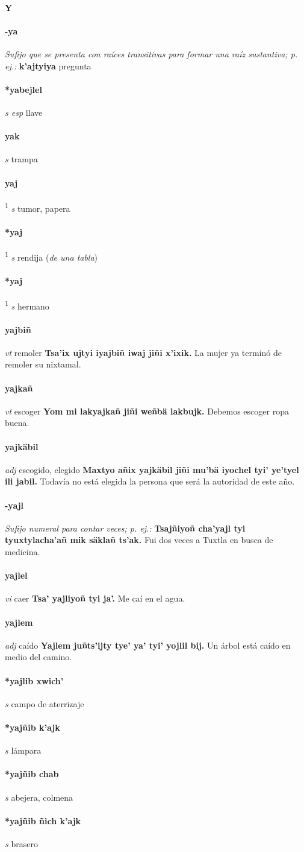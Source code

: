 \documentclass{scrbook}
\newcommand{\entry}[1]{\paragraph{#1}}
\newcommand{\alphaletter}[1]{\addsec{#1}}
\newcommand{\defsuperscript}[1]{\textsuperscript{1}}
\newcommand{\nontranslationdef}[1]{\textit{#1}}
\newcommand{\partofspeech}[1]{\textit{#1}}
\newcommand{\spanishtranslation}[1]{#1}
\newcommand{\clarification}[1]{(\textit{#1})}
\newcommand{\cholexample}[1]{\textbf{#1}}
\newcommand{\exampletranslation}[1]{#1}
\begin{document}
\begin{multicols}{2}
\entry{Y}
\alphaletter{Y}

\entry{-ya}
\nontranslationdef{Sufijo que se presenta con raíces transitivas para formar una raíz sustantiva; p. ej.:}
\cholexample{k'ajtyiya}
\exampletranslation{pregunta}

\entry{*yabejlel}
\partofspeech{s esp}
\spanishtranslation{llave}

\entry{yak}
\partofspeech{s}
\spanishtranslation{trampa}

\entry{yaj}
\defsuperscript{1}
\partofspeech{s}
\spanishtranslation{tumor, papera}

\entry{*yaj}
\defsuperscript{2}
\partofspeech{s}
\spanishtranslation{rendija}
\clarification{de una tabla}

\entry{*yaj}
\defsuperscript{3}
\partofspeech{s}
\spanishtranslation{hermano}

\entry{yajbiñ}
\partofspeech{vt}
\spanishtranslation{remoler}
\cholexample{Tsa'ix ujtyi iyajbiñ iwaj jiñi x'ixik.}
\exampletranslation{La mujer ya terminó de remoler su nixtamal.}

\entry{yajkañ}
\partofspeech{vt}
\spanishtranslation{escoger}
\cholexample{Yom mi lakyajkañ jiñi weñbä lakbujk.}
\exampletranslation{Debemos escoger ropa buena.}

\entry{yajkäbil}
\partofspeech{adj}
\spanishtranslation{escogido, elegido}
\cholexample{Maxtyo añix yajkäbil jiñi mu'bä iyochel tyi' ye'tyel ili jabil.}
\exampletranslation{Todavía no está elegida la persona que será la autoridad de este año.}

\entry{-yajl}
\nontranslationdef{Sufijo numeral para contar veces; p. ej.:}
\cholexample{Tsajñiyoñ cha'yajl tyi tyuxtylacha'añ mik säklañ ts'ak.}
\exampletranslation{Fui dos veces a Tuxtla en busca de medicina.}

\entry{yajlel}
\partofspeech{vi}
\spanishtranslation{caer}
\cholexample{Tsa' yajliyoñ tyi ja'.}
\exampletranslation{Me caí en el agua.}

\entry{yajlem}
\partofspeech{adj}
\spanishtranslation{caído}
\cholexample{Yajlem juñts'ijty tye' ya' tyi' yojlil bij.}
\exampletranslation{Un árbol está caído en medio del camino.}

\entry{*yajlib xwich'}
\partofspeech{s}
\spanishtranslation{campo de aterrizaje}

\entry{*yajñib k'ajk}
\partofspeech{s}
\spanishtranslation{lámpara}

\entry{*yajñib chab}
\partofspeech{s}
\spanishtranslation{abejera, colmena}

\entry{*yajñib ñich k'ajk}
\partofspeech{s}
\spanishtranslation{brasero}


\end{multicols}
\end{document}
